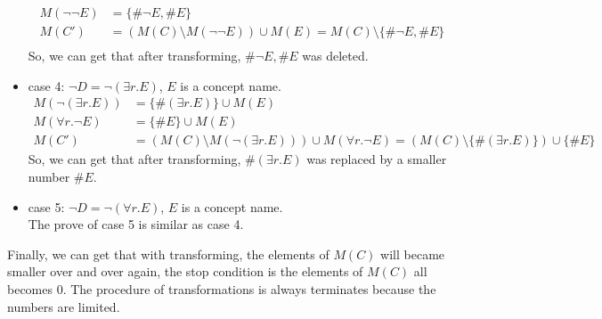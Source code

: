 \documentclass[12pt]{article}
\begin{document}
\begin{itemize}
    \begin{equation}
        \begin{aligned}
            M(\lnot  \lnot E) &= \{ \# \lnot E, \# E\} \\ 
            M(C') &= (M(C) \setminus M(\lnot \lnot E)) \cup M(E) = M(C) \setminus \{ \# \lnot E, \#E \} \\
            \nonumber
        \end{aligned}
        \nonumber
    \end{equation}
    So, we can get that after transforming, $\# \lnot E, \# E$ was deleted.
    \item case 4: $\lnot D = \lnot (\exists r.E)$, $E$ is a concept name. \\
    \begin{equation}
        \begin{aligned}
            M(\lnot (\exists r.E)) &= \{ \#(\exists r.E) \} \cup M(E) \\
            M(\forall r.\lnot E) &= \{ \#E \} \cup M(E) \\
            M(C') &= (M(C) \setminus M(\lnot (\exists r.E))) \cup M(\forall r.\lnot E) = (M(C) \setminus \{ \#(\exists r.E) \}) \cup \{ \#E \}
            \nonumber
        \end{aligned}
    \end{equation}
    So, we can get that after transforming, $\#(\exists r.E)$ was replaced by a smaller number $\#E$.
    \item case 5: $\lnot D = \lnot (\forall r.E)$, $E$ is a concept name. \\
    The prove of case 5 is similar as case 4.
    \end{itemize}
    Finally, we can get that with transforming, the elements of $M(C)$ will became smaller over and over again, the stop condition is the elements of $M(C)$ all becomes $0$.  The procedure of transformations is always terminates because the numbers are limited.\\
\end{document}
